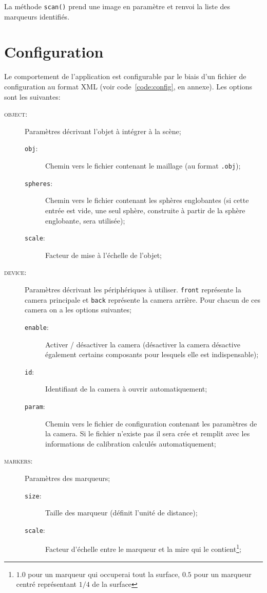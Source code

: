\documentclass[10pt,a4paper,twoside, twocolumn]{report}
\begin{document}
La méthode \texttt{scan()} prend une image en paramètre et renvoi la liste des marqueurs identifiés.



\section{Configuration}

Le comportement de l'application est configurable par le biais d'un fichier de configuration au format XML (voir code~\ref{code:config}, en annexe). Les options sont les suivantes:
\begin{description}
	\item[\textsc{object}:]		Paramètres décrivant l'objet à intégrer à la scène;
		\begin{description}
			\item[\texttt{obj}:]						Chemin vers le fichier contenant le maillage (au format \texttt{.obj});
			\item[\texttt{spheres}:]				Chemin vers le fichier contenant les sphères englobantes (si cette entrée est vide, une seul sphère, construite à partir de la sphère englobante, sera utilisée);
			\item[\texttt{scale}:]					Facteur de mise à l’échelle de l'objet;
		\end{description}

	\item[\textsc{device}:]		Paramètres décrivant les périphériques à utiliser. \texttt{front} représente la camera principale et \texttt{back} représente la camera arrière. Pour chacun de ces camera on a les options suivantes;
		\begin{description}
			\item[\texttt{enable}:]					Activer / désactiver la camera (désactiver la camera désactive également certains composants pour lesquels elle est indispensable);
			\item[\texttt{id}:]							Identifiant de la camera à ouvrir automatiquement;
			\item[\texttt{param}:]					Chemin vers le fichier de configuration contenant les paramètres de la camera. Si le fichier n'existe pas il sera crée et remplit avec les informations de calibration calculés automatiquement;
		\end{description}

	\item[\textsc{markers}:]	Paramètres des marqueurs;
		\begin{description}
			\item[\texttt{size}:]						Taille des marqueur (définit l’unité de distance);
			\item[\texttt{scale}:]					Facteur d’échelle entre le marqueur et la mire qui le contient\footnote{$1.0$ pour un marqueur qui occuperai tout la surface, $0.5$ pour un marqueur centré représentant $1/4$ de la surface};
		\end{description}
	

\end{description}
\end{document}
